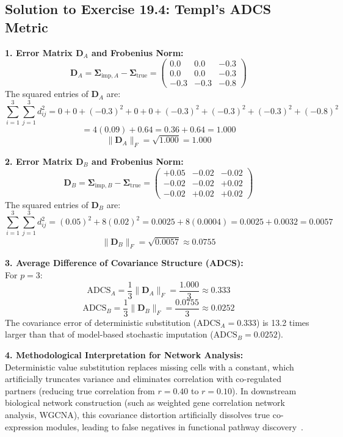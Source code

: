\documentclass[11pt,oneside]{book}
\begin{document}
\subsection*{Solution to Exercise 19.4: Templ's ADCS Metric}

\textbf{1. Error Matrix $\mathbf{D}_A$ and Frobenius Norm:}\\
$$\mathbf{D}_A = \boldsymbol{\Sigma}_{\text{imp}, A} - \boldsymbol{\Sigma}_{\text{true}} = \begin{pmatrix} 0.0 & 0.0 & -0.3 \\ 0.0 & 0.0 & -0.3 \\ -0.3 & -0.3 & -0.8 \end{pmatrix}$$
The squared entries of $\mathbf{D}_A$ are:
$$\sum_{i=1}^3 \sum_{j=1}^3 d_{ij}^2 = 0 + 0 + (-0.3)^2 + 0 + 0 + (-0.3)^2 + (-0.3)^2 + (-0.3)^2 + (-0.8)^2$$
$$= 4(0.09) + 0.64 = 0.36 + 0.64 = 1.000$$
$$\|\mathbf{D}_A\|_F = \sqrt{1.000} = 1.000$$

\textbf{2. Error Matrix $\mathbf{D}_B$ and Frobenius Norm:}\\
$$\mathbf{D}_B = \boldsymbol{\Sigma}_{\text{imp}, B} - \boldsymbol{\Sigma}_{\text{true}} = \begin{pmatrix} +0.05 & -0.02 & -0.02 \\ -0.02 & -0.02 & +0.02 \\ -0.02 & +0.02 & +0.02 \end{pmatrix}$$
The squared entries of $\mathbf{D}_B$ are:
$$\sum_{i=1}^3 \sum_{j=1}^3 d_{ij}^2 = (0.05)^2 + 8(0.02)^2 = 0.0025 + 8(0.0004) = 0.0025 + 0.0032 = 0.0057$$
$$\|\mathbf{D}_B\|_F = \sqrt{0.0057} \approx 0.0755$$

\textbf{3. Average Difference of Covariance Structure (ADCS):}\\
For $p = 3$:
$$\text{ADCS}_A = \frac{1}{3} \|\mathbf{D}_A\|_F = \frac{1.000}{3} \approx 0.333$$
$$\text{ADCS}_B = \frac{1}{3} \|\mathbf{D}_B\|_F = \frac{0.0755}{3} \approx 0.0252$$
The covariance error of deterministic substitution ($\text{ADCS}_A = 0.333$) is 13.2 times larger than that of model-based stochastic imputation ($\text{ADCS}_B = 0.0252$).

\textbf{4. Methodological Interpretation for Network Analysis:}\\
Deterministic value substitution replaces missing cells with a constant, which artificially truncates variance and eliminates correlation with co-regulated partners (reducing true correlation from $r = 0.40$ to $r = 0.10$). In downstream biological network construction (such as weighted gene correlation network analysis, WGCNA), this covariance distortion artificially dissolves true co-expression modules, leading to false negatives in functional pathway discovery~\cite{templ2023visualization}.
\end{document}
